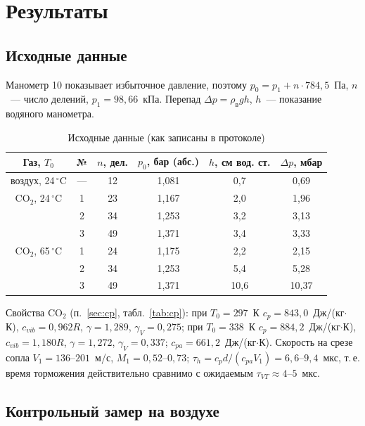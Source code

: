 \documentclass[12pt,a4paper]{article}
\newcommand{\COO}{\mathrm{CO_2}}
\begin{document}
\section{Результаты}\label{sec:res}

\subsection{Исходные данные}

Манометр 10 показывает избыточное давление, поэтому
$p_0 = p_1 + n\cdot 784{,}5$~Па, $n$~--- число делений, $p_1 = 98{,}66$~кПа.
Перепад $\Delta p = \rho_{\text{в}} g h$, $h$~--- показание водяного манометра.

\begin{table}[H]
\centering
\caption{Исходные данные (как записаны в протоколе)}
\label{tab:raw}
\begin{tabular}{cccccc}
\toprule
Газ, $T_0$ & № & $n$, дел. & $p_0$, бар (абс.) & $h$, см вод. ст. & $\Delta p$, мбар \\
\midrule
воздух, 24\,$^\circ$C & --- & 12 & 1,081 & 0,7 & 0,69 \\
\midrule
$\COO$, 24\,$^\circ$C & 1 & 23 & 1,167 & 2,0 & 1,96 \\
 & 2 & 34 & 1,253 & 3,2 & 3,13 \\
 & 3 & 49 & 1,371 & 3,4 & 3,33 \\
\midrule
$\COO$, 65\,$^\circ$C & 1 & 24 & 1,175 & 2,2 & 2,15 \\
 & 2 & 34 & 1,253 & 5,4 & 5,28 \\
 & 3 & 49 & 1,371 & 10,6 & 10,37 \\
\bottomrule
\end{tabular}
\end{table}

Свойства $\COO$ (п.~\ref{sec:cp}, табл.~\ref{tab:cp}): при $T_0 = 297$~К
$c_p = 843{,}0$~Дж/(кг$\cdot$К), $c_{vib} = 0{,}962R$, $\gamma = 1{,}289$,
$\gamma_V = 0{,}275$; при $T_0 = 338$~К $c_p = 884{,}2$~Дж/(кг$\cdot$К),
$c_{vib} = 1{,}180R$, $\gamma = 1{,}272$, $\gamma_V = 0{,}337$;
$c_{pa} = 661{,}2$~Дж/(кг$\cdot$К). Скорость на срезе сопла
$V_1 = 136\text{--}201$~м/с, $M_1 = 0{,}52\text{--}0{,}73$;
$\tau_h = c_pd/(c_{pa}V_1) = 6{,}6\text{--}9{,}4$~мкс, т.\,е. время
торможения действительно сравнимо с ожидаемым $\tau_{VT}\approx4\text{--}5$~мкс.

\subsection{Контрольный замер на воздухе}
\end{document}
